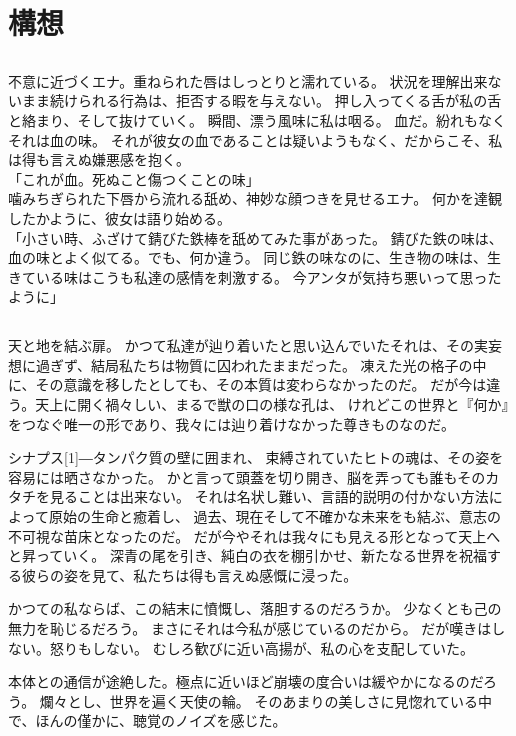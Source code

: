 \documentclass[autodetect-engine,dvipdfmx-if-dvi,a5paper,ja=standard,twoside,titlepage,final,twocolumn]{ltjtbook}
\begin{document}
\chapter{\rm 構想}
\section{}
不意に近づくエナ。重ねられた唇はしっとりと濡れている。
状況を理解出来ないまま続けられる行為は、拒否する暇を与えない。
押し入ってくる舌が私の舌と絡まり、そして抜けていく。
瞬間、漂う風味に私は咽る。
血だ。紛れもなくそれは血の味。
それが彼女の血であることは疑いようもなく、だからこそ、私は得も言えぬ嫌悪感を抱く。\\
「これが血。死ぬこと傷つくことの味」\\
噛みちぎられた下唇から流れる舐め、神妙な顔つきを見せるエナ。
何かを達観したかように、彼女は語り始める。\\
「小さい時、ふざけて錆びた鉄棒を舐めてみた事があった。
錆びた鉄の味は、血の味とよく似てる。でも、何か違う。
同じ鉄の味なのに、生き物の味は、生きている味はこうも私達の感情を刺激する。
今アンタが気持ち悪いって思ったように」

\section{}
天と地を結ぶ扉。
かつて私達が辿り着いたと思い込んでいたそれは、その実妄想に過ぎず、結局私たちは物質に囚われたままだった。
凍えた光の格子の中に、その意識を移したとしても、その本質は変わらなかったのだ。
だが今は違う。天上に開く禍々しい、まるで獣の口の様な孔は、
けれどこの世界と『何か』をつなぐ唯一の形であり、我々には辿り着けなかった尊きものなのだ。

シナプス\scalebox{3}[1]{―}タンパク質の壁に囲まれ、
束縛されていたヒトの魂は、その姿を容易には晒さなかった。
かと言って頭蓋を切り開き、脳を弄っても誰もそのカタチを見ることは出来ない。
それは名状し難い、言語的説明の付かない方法によって原始の生命と癒着し、
過去、現在そして不確かな未来をも結ぶ、意志の不可視な苗床となったのだ。
だが今やそれは我々にも見える形となって天上へと昇っていく。
深青の尾を引き、純白の衣を棚引かせ、新たなる世界を祝福する彼らの姿を見て、私たちは得も言えぬ感慨に浸った。

かつての私ならば、この結末に憤慨し、落胆するのだろうか。
少なくとも己の無力を恥じるだろう。
まさにそれは今私が感じているのだから。
だが嘆きはしない。怒りもしない。
むしろ歓びに近い高揚が、私の心を支配していた。

本体との通信が途絶した。極点に近いほど崩壊の度合いは緩やかになるのだろう。
爛々とし、世界を遍く天使の輪。
そのあまりの美しさに見惚れている中で、ほんの僅かに、聴覚のノイズを感じた。
\end{document}
